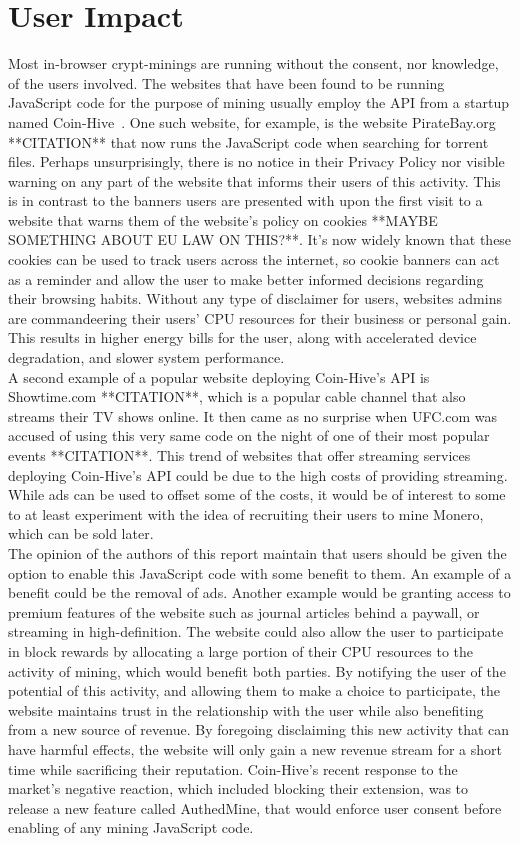 \section{User Impact}

Most in-browser crypt-minings are running without the consent, nor knowledge, of the users involved. The websites that have been found to be running JavaScript code for the purpose of mining usually employ the API from a startup named Coin-Hive~\cite{coinhive}. One such website, for example, is the website PirateBay.org **CITATION** that now runs the JavaScript code when searching for torrent files. Perhaps unsurprisingly, there is no notice in their Privacy Policy nor visible warning on any part of the website that informs their users of this activity. This is in contrast to the banners users are presented with upon the first visit to a website that warns them of the website’s policy on cookies **MAYBE SOMETHING ABOUT EU LAW ON THIS?**. It’s now widely known that these cookies can be used to track users across the internet, so cookie banners can act as a reminder and allow the user to make better informed decisions regarding their browsing habits. Without any type of disclaimer for users, websites admins are commandeering their users’ CPU resources for their business or personal gain. This results in higher energy bills for the user, along with accelerated device degradation, and slower system performance.
\\
A second example of a popular website deploying Coin-Hive’s API is Showtime.com **CITATION**, which is a popular cable channel that also streams their TV shows online. It then came as no surprise when UFC.com was accused of using this very same code on the night of one of their most popular events **CITATION**. This trend of websites that offer streaming services deploying Coin-Hive’s API could be due to the high costs of providing streaming. While ads can be used to offset some of the costs, it would be of interest to some to at least experiment with the idea of recruiting their users to mine Monero, which can be sold later.
\\
The opinion of the authors of this report maintain that users should be given the option to enable this JavaScript code with some benefit to them.  An example of a benefit could be the removal of ads. Another example would be granting access to premium features of the website such as journal articles behind a paywall, or streaming in high-definition. The website could also allow the user to participate in block rewards by allocating a large portion of their CPU resources to the activity of mining, which would benefit both parties. By notifying the user of the potential of this activity, and allowing them to make a choice to participate, the website maintains trust in the relationship with the user while also benefiting from a new source of revenue. By foregoing disclaiming this new activity that can have harmful effects, the website will only gain a new revenue stream for a short time while sacrificing their reputation. Coin-Hive’s recent response to the market’s negative reaction, which included blocking their extension, was to release a new feature called AuthedMine, that would enforce user consent before enabling of any mining JavaScript code. 
